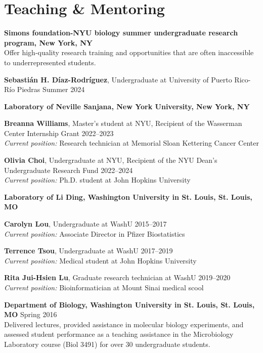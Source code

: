 \documentclass[letterpaper,11pt]{cv}
\begin{document}
\section{Teaching \& Mentoring}

\begin{entrylist}
\raggedright
\item \textbf{Simons foundation-NYU biology summer undergraduate research program, New York, NY}\\  
{\small Offer high-quality research training and opportunities that are often inaccessible to underrepresented students.}
\begin{detaillist}
    \item \textbf{Sebastián H. Díaz-Rodríguez}, Undergraduate at University of Puerto Rico-Río Piedras \hfill Summer 2024 \\
\end{detaillist}
\item \textbf{Laboratory of Neville Sanjana, New York University, New York, NY}\\
    \begin{detaillist}
       \item \textbf{Breanna Williams}, Master's student at NYU, Recipient of the Wasserman Center Internship Grant \hfill 2022--2023\\
       \textit{Current position:} Research technician at Memorial Sloan Kettering Cancer Center
       \item \textbf{Olivia Choi}, Undergraduate at NYU, Recipient of the NYU Dean's Undergraduate Research Fund \hfill 2022--2024\\
       \textit{Current position:} Ph.D. student at John Hopkins University
    \end{detaillist}
\item \textbf{Laboratory of Li Ding, Washington University in St. Louis, St. Louis, MO}\\
    \begin{detaillist}
    \item \textbf{Carolyn Lou}, Undergraduate at WashU \hfill 2015--2017\\
    \textit{Current position:} Associate Director in Pfizer Biostatistics
    \item \textbf{Terrence Tsou}, Undergraduate at WashU \hfill 2017--2019\\
    \textit{Current position:} Medical student at John Hopkins University
    \item \textbf{Rita Jui-Hsien Lu}, Graduate research technician at WashU \hfill 2019--2020\\
    \textit{Current position:} Bioinformatician at Mount Sinai medical scool
    \end{detaillist}
\item \textbf{Department of Biology, Washington University in St. Louis, St. Louis, MO} \hfill Spring 2016 \\
    {\small Delivered lectures, provided assistance in molecular biology experiments, and assessed student performance as a teaching assistance in the Microbiology Laboratory course (Biol 3491) for over 30 undergraduate students.}
\end{entrylist}
\end{document}

